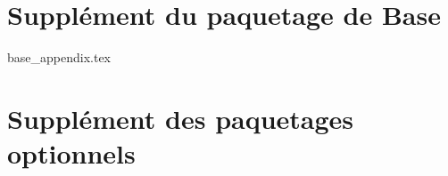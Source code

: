 \appendix

\chapter {Supplément du paquetage de Base}
 {base_appendix.tex}

\chapter {Supplément des paquetages optionnels}
